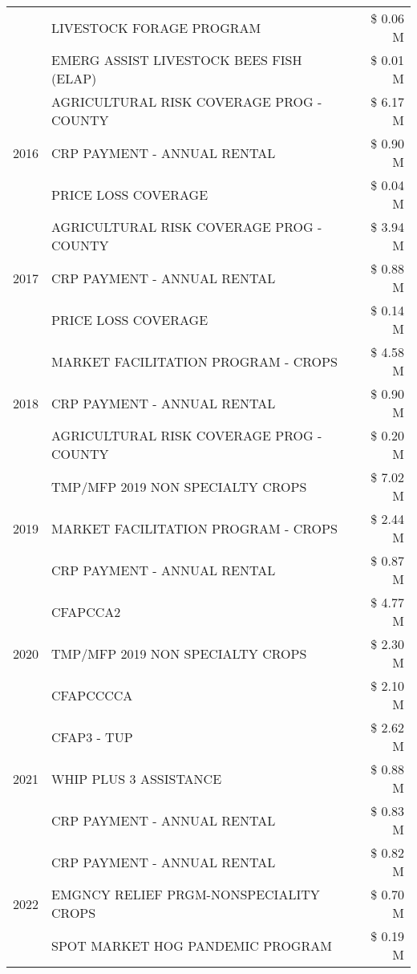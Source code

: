\begin{tabular}{llr}
 & LIVESTOCK FORAGE PROGRAM & \$ 0.06 M \\
 & EMERG ASSIST LIVESTOCK BEES FISH (ELAP) & \$ 0.01 M \\
\cline{1-3}
\multirow[t]{3}{*}{2016} & AGRICULTURAL RISK COVERAGE PROG - COUNTY & \$ 6.17 M \\
 & CRP PAYMENT - ANNUAL RENTAL & \$ 0.90 M \\
 & PRICE LOSS COVERAGE & \$ 0.04 M \\
\cline{1-3}
\multirow[t]{3}{*}{2017} & AGRICULTURAL RISK COVERAGE PROG - COUNTY & \$ 3.94 M \\
 & CRP PAYMENT - ANNUAL RENTAL & \$ 0.88 M \\
 & PRICE LOSS COVERAGE & \$ 0.14 M \\
\cline{1-3}
\multirow[t]{3}{*}{2018} & MARKET FACILITATION PROGRAM - CROPS & \$ 4.58 M \\
 & CRP PAYMENT - ANNUAL RENTAL & \$ 0.90 M \\
 & AGRICULTURAL RISK COVERAGE PROG - COUNTY & \$ 0.20 M \\
\cline{1-3}
\multirow[t]{3}{*}{2019} & TMP/MFP 2019 NON SPECIALTY CROPS & \$ 7.02 M \\
 & MARKET FACILITATION PROGRAM - CROPS & \$ 2.44 M \\
 & CRP PAYMENT - ANNUAL RENTAL & \$ 0.87 M \\
\cline{1-3}
\multirow[t]{3}{*}{2020} & CFAPCCA2 & \$ 4.77 M \\
 & TMP/MFP 2019 NON SPECIALTY CROPS & \$ 2.30 M \\
 & CFAPCCCCA & \$ 2.10 M \\
\cline{1-3}
\multirow[t]{3}{*}{2021} & CFAP3 - TUP & \$ 2.62 M \\
 & WHIP PLUS 3 ASSISTANCE & \$ 0.88 M \\
 & CRP PAYMENT - ANNUAL RENTAL & \$ 0.83 M \\
\cline{1-3}
\multirow[t]{3}{*}{2022} & CRP PAYMENT - ANNUAL RENTAL & \$ 0.82 M \\
 & EMGNCY RELIEF PRGM-NONSPECIALITY CROPS & \$ 0.70 M \\
 & SPOT MARKET HOG PANDEMIC PROGRAM & \$ 0.19 M \\
\cline{1-3}
\bottomrule
\end{tabular}
